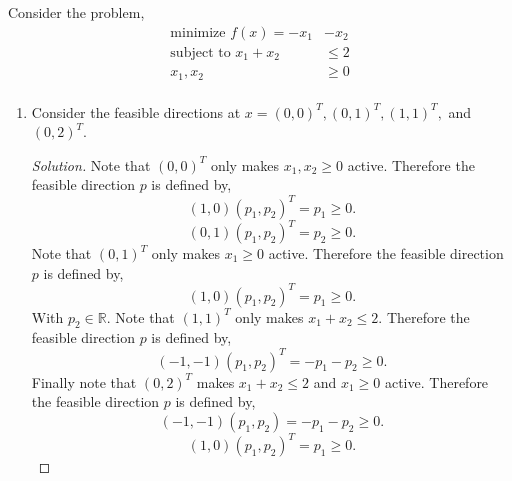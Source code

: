 \documentclass[12pt]{article}
\makeatletter
\theoremstyle{homework}
\newenvironment{exercise}[1]
{\def\@currentlabel{#1}\exercisecore}
{\endexercisecore}
\newcommand{\Reals}{\ensuremath{\mathbb R}}
\let\RR\Reals
\makeatother
\begin{document}
\begin{exercise}{4.3} Consider the problem, 
  \begin{align*}
    \text{minimize }f(x) = -x_1 &- x_2\\
    \text{subject to }x_1 + x_2 &\leq 2\\
    x_1, x_2 &\geq 0\\
  \end{align*}
  \begin{enumerate}
  \item Consider the feasible directions at $x = (0,0)^T,(0,1)^T, (1,1)^T,$ and $(0,2)^T$. 
  \begin{proof}[Solution]
    Note that $(0, 0)^T$ only makes $x_1, x_2 \geq 0$ active. Therefore the feasible direction $p$ is defined by, 
    \begin{equation*}
      (1, 0)(p_1, p_2)^T = p_1 \geq 0.
    \end{equation*}
    \begin{equation*}
      (0, 1)(p_1, p_2)^T = p_2 \geq 0.
    \end{equation*}
    Note that $(0, 1)^T$ only makes $x_1 \geq 0$ active. Therefore the feasible direction $p$ is defined by, 
    \begin{equation*}
      (1, 0)(p_1, p_2)^T = p_1 \geq 0.
    \end{equation*}
    With $p_2 \in \RR$. 
    Note that $(1,1)^T$ only makes $x_1 + x_2 \leq 2$. Therefore the feasible direction $p$ is defined by, 
    \begin{equation*}
      (-1, -1)(p_1, p_2)^T = -p_1 - p_2 \geq 0.
    \end{equation*}
    Finally note that $(0,2)^T$ makes $x_1 + x_2 \leq 2$ and $x_1 \geq 0$ active. Therefore the feasible direction $p$ is defined by, 
    \begin{equation*}
      (-1, -1)(p_1, p_2) = -p_1 - p_2 \geq 0.
    \end{equation*}
    \begin{equation*}
      (1, 0)(p_1, p_2)^T = p_1 \geq 0.
    \end{equation*}
  \end{proof}
  \vspace{.15in}



\end{enumerate}
\end{exercise}
\end{document}
